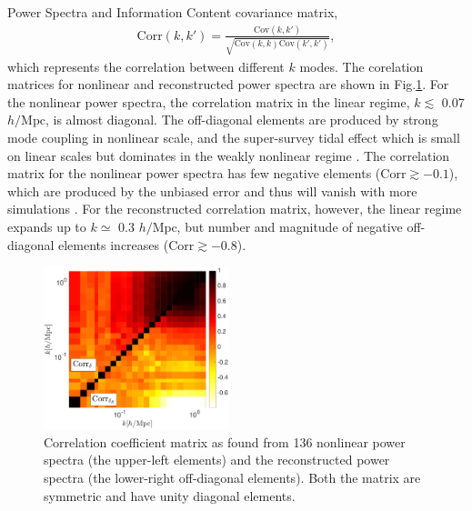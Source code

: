 \begin{section}{Power Spectra and Information Content}
  covariance matrix,
  \begin{align}
    \mathrm{Corr}\left(k,k'\right)=\frac{\mathrm{Cov}\left(k,k'\right)}
    {\sqrt{\mathrm{Cov}\left(k,k\right)\mathrm{Cov}\left(k',k'\right)}},
  \end{align}
  which represents the correlation between different $k$ modes.  The
  corelation matrices for nonlinear and reconstructed power spectra
  are shown in Fig.\ref{fig:corrall}. For the nonlinear power spectra,
  the correlation matrix in the linear regime, $k \lesssim$ 0.07
  $h/\mathrm{Mpc}$, is almost diagonal.  The off-diagonal elements are
  produced by strong mode coupling in nonlinear scale, and the
  super-survey tidal effect which is small on linear scales but
  dominates in the weakly nonlinear regime \cite{bib:Kazuyuki2016}.
  The correlation matrix for the nonlinear power spectra has few
  negative elements ($\mathrm{Corr} \gtrsim -0.1$), which are produced
  by the unbiased error and thus will vanish with more simulations
  \cite{bib:Takahashi2009}.  For the reconstructed correlation matrix,
  however, the linear regime expands up to $k \simeq$ 0.3
  $h/\mathrm{Mpc}$, but number and magnitude of negative off-diagonal
  elements increases ($\mathrm{Corr} \gtrsim -0.8$).

  \begin{figure}
    \centering
    \includegraphics[width=0.48\textwidth]{fig3.pdf}
    \caption{Correlation coefficient matrix as found from 136
      nonlinear power spectra (the upper-left elements) and the
      reconstructed power spectra (the lower-right off-diagonal
      elements). Both the matrix are symmetric and have unity diagonal
      elements.}
    \label{fig:corrall}
  \end{figure}


\end{section}
